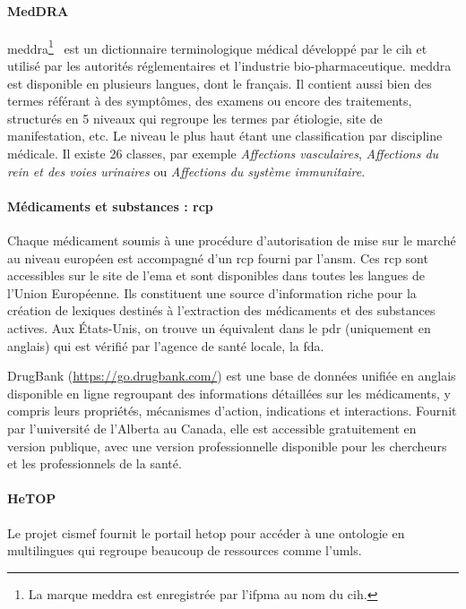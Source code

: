\paragraph{MedDRA}
\gls{meddra}\footnote{La marque \gls{meddra} est enregistrée par l'\acs{ifpma} au nom du \acs{cih}.}~\cite{brownMedicalDictionaryRegulatory1999} est un dictionnaire terminologique médical développé par le \gls{cih} et utilisé par les autorités réglementaires et l'industrie bio-pharmaceutique.
\gls{meddra} est disponible en plusieurs langues, dont le français.
Il contient aussi bien des termes référant à des symptômes, des examens ou encore des traitements, structurés en 5 niveaux qui regroupe les termes par étiologie, site de manifestation, etc.
Le niveau le plus haut étant une classification par discipline médicale.
Il existe 26 classes, par exemple \textit{Affections vasculaires}, \textit{Affections du rein et des voies urinaires} ou \textit{Affections du système immunitaire}.

\paragraph{Médicaments et substances : \gls*{rcp}}
Chaque médicament soumis à une procédure d'autorisation de mise sur le marché au niveau européen est accompagné d'un \gls{rcp} fourni par l'\gls{ansm}.
Ces \gls{rcp} sont accessibles sur le site de l'\gls{ema} et sont disponibles dans toutes les langues de l'Union Européenne.
Ils constituent une source d'information riche pour la création de lexiques destinés à l'extraction des médicaments et des substances actives.
Aux États-Unis, on trouve un équivalent dans le \gls{pdr} (uniquement en anglais) qui est vérifié par l'agence de santé locale, la \gls{fda}.

DrugBank \cite{wishartDrugBankKnowledgebaseDrugs2008,wishartDrugBankMajorUpdate2018} (\url{https://go.drugbank.com/}) est une base de données unifiée en anglais disponible en ligne regroupant des informations détaillées sur les médicaments, y compris leurs propriétés, mécanismes d'action, indications et interactions.
Fournit par l'université de l'Alberta au Canada, elle est accessible gratuitement en version publique, avec une version professionnelle disponible pour les chercheurs et les professionnels de la santé.

\paragraph{HeTOP}
Le projet \gls{cismef} fournit le portail \gls{hetop} pour accéder à une ontologie en multilingues qui regroupe beaucoup de ressources comme l'\gls{umls}.

